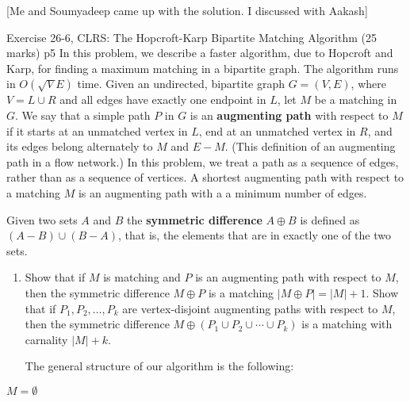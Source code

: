 \documentclass[a4paper, 11pt]{article}
\begin{document}
[Me and Soumyadeep came up with the solution. I discussed with Aakash]\parinn


\newpage

\begin{problem}{%
	Exercise 26-6, CLRS: The Hopcroft-Karp Bipartite Matching Algorithm	\hfill  (25 marks)
}{p5%
}In this problem, we describe a faster algorithm, due to Hopcroft and Karp, for finding a maximum matching in a bipartite graph. The algorithm runs in $O(\sqrt{V}E)$ time. Given an undirected, bipartite graph $G=(V,E)$, where $V=L\cup R$ and all edges have exactly one endpoint in $L$, let $M$ be a matching in $G$. We say that a simple path $P$ in $G$ is an \textbf{augmenting path} with respect to $M$ if it starts at an unmatched vertex in $L$, end at an unmatched vertex in $R$, and its edges belong alternately to $M$ and $E-M$. (This definition of an augmenting path in a flow network.) In this problem, we treat a path as a sequence of edges, rather than as a sequence of vertices. A shortest augmenting path with respect to a matching $M$ is an augmenting path with a a minimum number of edges. \parinn

Given two sets $A$ and $B$ the \textbf{symmetric difference} $A\oplus B$ is defined as $(A-B)\cup (B-A)$, that is, the elements that are in exactly one of the two sets.
\begin{enumerate}[label=\bfseries\alph*.]
	\item Show that if $M$ is matching and  $P$ is an augmenting path with respect to $M$, then the symmetric difference $M\oplus P$ is a matching $|M\oplus P|=|M|+1$. Show that if $P_1,P_2,\dots, P_k$ are vertex-disjoint augmenting paths with respect to $M$, then the symmetric difference $M\oplus (P_1\cup P_2\cup \cdots \cup P_k)$ is a matching with carnality $|M|+k$.
	
	The general structure of our algorithm is the following:
\end{enumerate}	
	\begin{algorithm}[H]
		\DontPrintSemicolon
		$M=\emptyset$\;
		\caption{$(G)$}
	\end{algorithm}\parinn


\end{problem}
\end{document}
